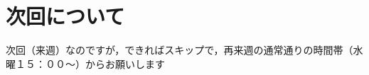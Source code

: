 \documentclass[11pt]{jsarticle}
\begin{document}
	\section{次回について}
		次回（来週）なのですが，できればスキップで，再来週の通常通りの時間帯（水曜１５：００～）からお願いします
	\newpage
\vspace{10cm}
	

\vspace{14cm}
	\articleSPRfour
	\articleSPRfive
\end{document}
